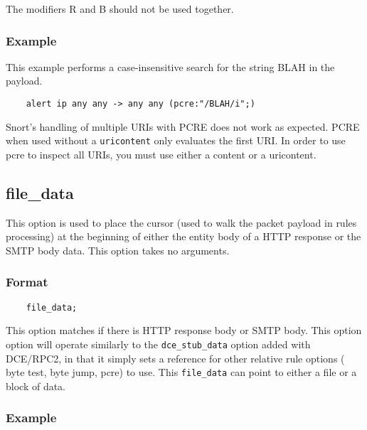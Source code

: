 \documentclass[english]{report}
\newenvironment{note}{
\samepage
    \vspace{10pt}{\textsf{
        {\hspace{7pt}\Huge{$\triangle$\hspace{-12.5pt}{\Large{$^!$}}}}\hspace{5pt}
        {\Large{NOTE}}
    }
    }
   \begin{center}
    \par\vspace{-17pt}

    \begin{lrbox}{\savepar}
    \begin{minipage}[r]{6in}
}
{
    \end{minipage}
    \end{lrbox}
    \fbox{
        \usebox{
            \savepar
	}
    }
    \par\vskip10pt
    \end{center}
}
\newenvironment{note}{
        \begin{rawhtml}
        <p><table border="1"><tr><td><b>
        Note:&nbsp;&nbsp;</b>
        \end{rawhtml}
}{
        \begin{rawhtml}
        </b></td></tr></table></p>
        \end{rawhtml}
}
\begin{document}
\begin{note}
The modifiers R and B should not be used together.
\end{note}

\subsubsection{Example}

This example performs a case-insensitive search for the string BLAH in the payload.

\begin{verbatim}
    alert ip any any -> any any (pcre:"/BLAH/i";)
\end{verbatim}

\begin{note}

Snort's handling of multiple URIs with PCRE does not work as expected.  PCRE
when used without a \texttt{uricontent} only evaluates the first URI.  In order
to use pcre to inspect all URIs, you must use either a content or a uricontent.

\end{note}

\subsection{file\_data}
\label{sub:file_data}
This option is used to place the cursor (used to walk the packet payload in
rules processing) at the beginning of either the entity body of a HTTP     
response or the SMTP body data. This option takes no arguments.

\subsubsection{Format}

\begin{verbatim}
	file_data;
\end{verbatim}

This option matches if there is HTTP response body or SMTP body. This option       
option will operate similarly to the \texttt{dce\_stub\_data} option added with DCE/RPC2, 
in that it simply sets a reference for other relative rule options 
( byte test, byte jump, pcre) to use. This \texttt{file\_data} can point to either a 
file or a block of data.

\subsubsection{Example}
\end{document}
